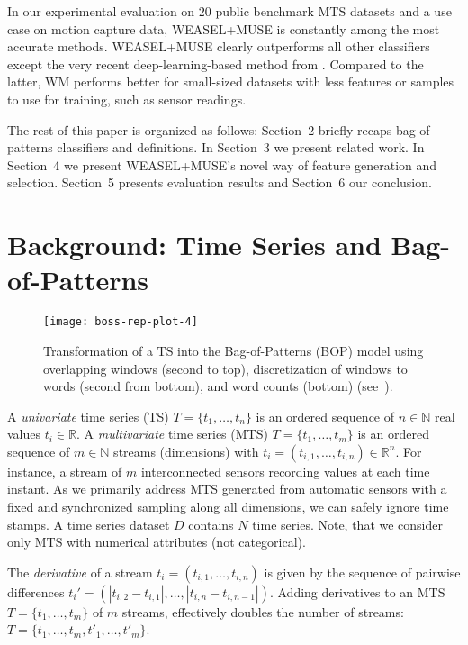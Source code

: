 \documentclass[sigconf]{acmart}
\begin{document}
In our experimental evaluation on $20$ public benchmark MTS datasets and a use case on motion capture data, WEASEL+MUSE is constantly among the most accurate methods. 
WEASEL+MUSE clearly outperforms all other classifiers except the very recent deep-learning-based method from \cite{karim2018multivariate}. Compared to the latter, WM performs better for small-sized datasets with less features or samples to use for training, such as sensor readings.



The rest of this paper is organized as follows: Section~2 briefly recaps bag-of-patterns classifiers and definitions. In Section~3 we present related work. In Section~4 we present WEASEL+MUSE's novel way of feature generation and selection. Section~5 presents evaluation results and Section~6 our conclusion.


\section{Background: Time Series and Bag-of-Patterns}

\begin{figure}
	\begin{centering}
		\texttt{[image: boss-rep-plot-4]}
		\par\end{centering}
	\caption{Transformation of a TS into the Bag-of-Patterns (BOP) model using overlapping windows (second to top), discretization of windows to words (second from bottom), and word counts (bottom) (see~\cite{schaefer2017weasel}).\label{fig:transformation}}
\end{figure}

A \emph{univariate} time series (TS) $T=\{t_{1},\ldots,t_{n}\}$
is an ordered sequence of $n\in\mathbb{N}$ real values $t_{i} \in \mathbb{R}$. A \emph{multivariate} time series (MTS) $T=\{t_{1}, \ldots ,t_{m}\}$ is an ordered sequence of $m \in \mathbb{N}$ streams (dimensions) with $t_{i}=(t_{i,1},\ldots, t_{i,n}) \in \mathbb{R}^{n}$. 
For instance, a stream of $m$ interconnected sensors recording values at each time instant. As we primarily address MTS generated from automatic sensors with a fixed and synchronized sampling along all dimensions, we can safely ignore time stamps. A time series dataset $D$ contains $N$ time series. Note, that we consider only MTS with numerical attributes (not categorical).

The \emph{derivative} of a stream $t_{i}=(t_{i,1},\ldots, t_{i,n})$ is given by the sequence of pairwise differences $t_{i}'=(|t_{i,2}-t_{i,1}|,\ldots, |t_{i,n}-t_{i,n-1}|)$. Adding derivatives to an MTS $T=\{t_{1}, \ldots ,t_{m}\}$ of $m$ streams, effectively doubles the number of streams: $T=\{t_{1}, \ldots ,t_{m}, t'_{1}, \ldots , t'_{m}\}$.
\end{document}
